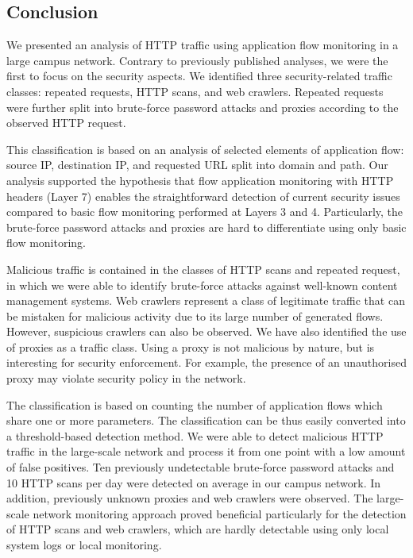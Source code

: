 \subsection{Conclusion}\label{subsec:httpsecurity-conclusion}

We presented an analysis of HTTP traffic using application flow monitoring in a large campus network. Contrary to previously published analyses, we were the first to focus on the security aspects.
We identified three security-related traffic classes: repeated requests, HTTP scans, and web crawlers. Repeated requests were further split into brute-force password attacks and proxies according to the observed HTTP request.

This classification is based on an analysis of selected elements of application flow: source IP, destination IP, and requested URL split into domain and path.
Our analysis supported the hypothesis that flow application monitoring with HTTP headers (Layer 7) enables the straightforward detection of current security issues compared to basic flow monitoring performed at Layers 3 and 4. Particularly, the brute-force password attacks and proxies are hard to differentiate using only basic flow monitoring.

Malicious traffic is contained in the classes of HTTP scans and repeated request, in which we were able to identify brute-force attacks against well-known content management systems. Web crawlers represent a class of legitimate traffic that can be mistaken for malicious activity due to its large number of generated flows. However, suspicious crawlers can also be observed. We have also identified the use of proxies as a traffic class. Using a proxy is not malicious by nature, but is interesting for security enforcement. For example, the presence of an unauthorised proxy may violate security policy in the network.

The classification is based on counting the number of application flows which share one or more parameters. The classification can be thus easily converted into a threshold-based detection method. 
We were able to detect malicious HTTP traffic in the large-scale network and process it from one point with a low amount of false positives. Ten previously undetectable brute-force password attacks and 10 HTTP scans per day were detected on average in our campus network. In addition, previously unknown proxies and web crawlers were observed. 
The large-scale network monitoring approach proved beneficial particularly for the detection of HTTP scans and web crawlers, which are hardly detectable using only local system logs or local monitoring.

